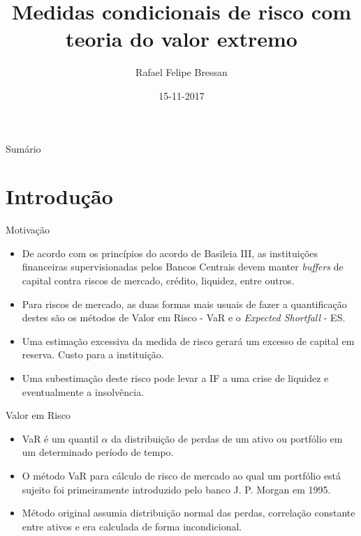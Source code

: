 \documentclass[ignorenonframetext,]{beamer}
\title{Medidas condicionais de risco com teoria do valor extremo}
\author{Rafael Felipe Bressan}
\date{15-11-2017}
\providecommand{\tightlist}{%
\setlength{\itemsep}{0pt}\setlength{\parskip}{0pt}}
\begin{document}
\frame{\titlepage}

\section[]{}
\begin{frame}{Sumário}
  \tableofcontents
\end{frame}

\section{Introdução}\label{introducao}

\begin{frame}{Motivação}

\begin{itemize}
\tightlist
\item
  De acordo com os princípios do acordo de Basileia III, as instituições
  financeiras supervisionadas pelos Bancos Centrais devem manter
  \emph{buffers} de capital contra riscos de mercado, crédito, liquidez,
  entre outros.
\item
  Para riscos de mercado, as duas formas mais usuais de fazer a
  quantificação destes são os métodos de Valor em Risco - VaR e o
  \emph{Expected Shortfall} - ES.
\item
  Uma estimação excessiva da medida de risco gerará um excesso de
  capital em reserva. Custo para a instituição.
\item
  Uma subestimação deste risco pode levar a IF a uma crise de liquidez e
  eventualmente a insolvência.
\end{itemize}

\end{frame}

\begin{frame}{Valor em Risco}

\begin{itemize}
\tightlist
\item
  VaR é um quantil \(\alpha\) da distribuição de perdas de um ativo ou
  portfólio em um determinado período de tempo.
\item
  O método VaR para cálculo de risco de mercado ao qual um portfólio
  está sujeito foi primeiramente introduzido pelo banco J. P. Morgan em
  1995.
\item
  Método original assumia distribuição normal das perdas, correlação
  constante entre ativos e era calculada de forma incondicional.
\end{itemize}

\end{frame}
\end{document}
